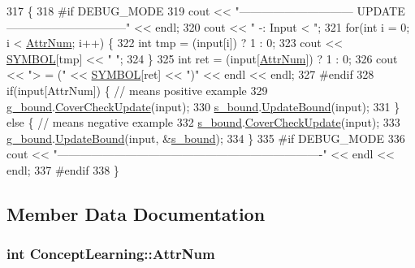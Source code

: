 \begin{DoxyCode}
317                                                     \{
318 \textcolor{preprocessor}{#if DEBUG\_MODE}
319 \textcolor{preprocessor}{}    cout << \textcolor{stringliteral}{"------------------------------ UPDATE --------------------------------"} << endl;
320     cout << \textcolor{stringliteral}{" -: Input < "};
321     \textcolor{keywordflow}{for}(\textcolor{keywordtype}{int} i = 0; i < \hyperlink{class_concept_learning_ae6bebaccc7f80436856e5ec539feb04c}{AttrNum}; i++) \{
322         \textcolor{keywordtype}{int} tmp = (input[i]) ? 1 : 0;
323         cout << \hyperlink{concept_8cpp_a6a0fcd5aed2dc21ce5f79cbe7c3a8e2f}{SYMBOL}[tmp] << \textcolor{stringliteral}{" "};
324     \}
325     \textcolor{keywordtype}{int} ret = (input[\hyperlink{class_concept_learning_ae6bebaccc7f80436856e5ec539feb04c}{AttrNum}]) ? 1 : 0;
326     cout << \textcolor{stringliteral}{"> = ("} << \hyperlink{concept_8cpp_a6a0fcd5aed2dc21ce5f79cbe7c3a8e2f}{SYMBOL}[ret] << \textcolor{stringliteral}{")"} << endl << endl;
327 \textcolor{preprocessor}{#endif}
328 \textcolor{preprocessor}{}    \textcolor{keywordflow}{if}(input[AttrNum]) \{    \textcolor{comment}{// means positive example}
329         \hyperlink{class_concept_learning_a449a58ac04e18fd981b2e6bf984fd764}{g\_bound}.\hyperlink{class_g___bound_a9344fe22bb13d39a425c5a5b690aace4}{CoverCheckUpdate}(input);
330         \hyperlink{class_concept_learning_a8ac1de9ab4694d91cffabda42443a96e}{s\_bound}.\hyperlink{class_s___bound_a1391ba6c3f3fab3fd5fa57ecf8e1e66a}{UpdateBound}(input);
331     \} \textcolor{keywordflow}{else} \{    \textcolor{comment}{// means negative example}
332         \hyperlink{class_concept_learning_a8ac1de9ab4694d91cffabda42443a96e}{s\_bound}.\hyperlink{class_s___bound_aee5a88ab73dd09ac42953b6f3545dfe2}{CoverCheckUpdate}(input);
333         \hyperlink{class_concept_learning_a449a58ac04e18fd981b2e6bf984fd764}{g\_bound}.\hyperlink{class_g___bound_a8b473f262762ac5b74fdb766ded033aa}{UpdateBound}(input, &\hyperlink{class_concept_learning_a8ac1de9ab4694d91cffabda42443a96e}{s\_bound});
334     \}
335 \textcolor{preprocessor}{#if DEBUG\_MODE}
336 \textcolor{preprocessor}{}    cout << \textcolor{stringliteral}{"----------------------------------------------------------------------"} << endl << endl;
337 \textcolor{preprocessor}{#endif}
338 \textcolor{preprocessor}{}\}
\end{DoxyCode}


\subsection{Member Data Documentation}
\hypertarget{class_concept_learning_ae6bebaccc7f80436856e5ec539feb04c}{
\subsubsection[{Attr\-Num}]{\setlength{\rightskip}{0pt plus 5cm}int Concept\-Learning\-::\-Attr\-Num\hspace{0.3cm}{\ttfamily [private]}}}\label{class_concept_learning_ae6bebaccc7f80436856e5ec539feb04c}


